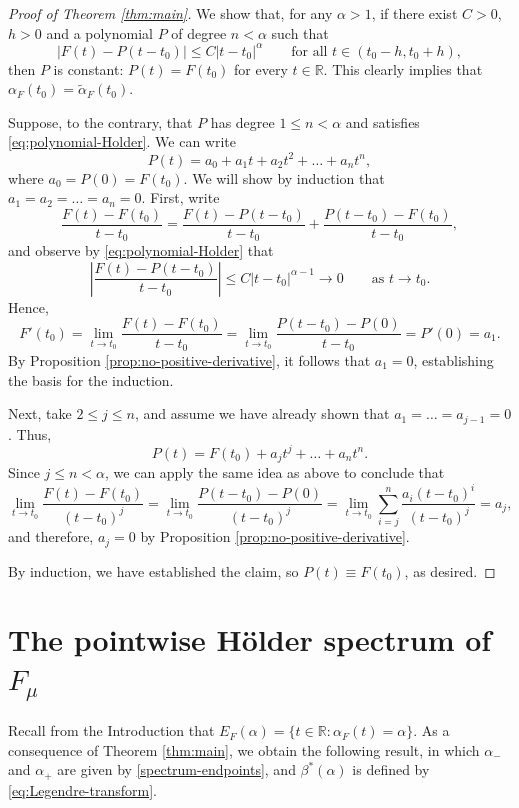\documentclass[11pt]{amsart}
\newcommand\RR{\mathbb{R}}
\newcommand{\1}{1}
\begin{document}
\begin{proof}[Proof of Theorem \ref{thm:main}]
We show that, for any $\alpha>1$, if there {exist $C>0$, $h>0$ and} a polynomial $P$ of degree $n<\alpha$ such that
\begin{equation} \label{eq:polynomial-Holder}
|F(t)-P(t-t_0)|\leq C|t-t_0|^\alpha \qquad \mbox{for all {$t\in(t_0-h,t_0+h)$}},
\end{equation}
then $P$ is constant: $P(t)=F(t_0)$ for every $t\in\RR$. This clearly implies that $\alpha_F(t_0)=\tilde{\alpha}_F(t_0)$.

Suppose, to the contrary, that $P$ has degree $1\leq n<\alpha$ and satisfies \eqref{eq:polynomial-Holder}. We can write
\[
P(t)=a_0+a_1 t+a_2 t^2+\dots +a_n t^n,
\]
where $a_0=P(0)=F(t_0)$. We will show by induction that $a_1=a_2=\dots=a_n=0$. First, write
\[
\frac{F(t)-F(t_0)}{t-t_0}=\frac{F(t)-P(t-t_0)}{t-t_0}+\frac{P(t-t_0)-F(t_0)}{t-t_0},
\]
and observe by \eqref{eq:polynomial-Holder} that
\[
\left|\frac{F(t)-P(t-t_0)}{t-t_0}\right|\leq C|t-t_0|^{\alpha-1} \to 0 \qquad \mbox{as $t\to t_0$}.
\]
Hence,
\[
F'(t_0)=\lim_{t\to t_0}\frac{F(t)-F(t_0)}{t-t_0}=\lim_{t\to t_0}\frac{P(t-t_0)-P(0)}{t-t_0}=P'(0)=a_1.
\]
By Proposition \ref{prop:no-positive-derivative}, it follows that $a_1=0$, establishing the basis for the induction.

Next, take $2\leq j\leq n$, and assume we have already shown that $a_1=\dots=a_{j-1}=0$. Thus,
\[
P(t)=F(t_0)+a_j t^j+\dots+a_n t^n.
\]
Since $j\leq n<\alpha$, we can apply the same idea as above to conclude that
\[
\lim_{t\to t_0}\frac{F(t)-F(t_0)}{(t-t_0)^j}=\lim_{t\to t_0}\frac{P(t-t_0)-P(0)}{(t-t_0)^j}=\lim_{t\to t_0}\sum_{i=j}^n \frac{a_i(t-t_0)^i}{(t-t_0)^j}=a_j,
\]
and therefore, $a_j=0$ by Proposition \ref{prop:no-positive-derivative}.

By induction, we have established the claim, so $P(t)\equiv F(t_0)$, as desired.
\end{proof}


\section{The pointwise H\"older spectrum of $F_\mu$} \label{sec:Holder-spectrum}

Recall from the Introduction that $E_F(\alpha)=\{t\in\RR:\alpha_F(t)=\alpha\}$.
As a consequence of Theorem \ref{thm:main}, we obtain the following result, in which $\alpha_-$ and $\alpha_+$ are given by \eqref{spectrum-endpoints}, and $\beta^*(\alpha)$ is defined by \eqref{eq:Legendre-transform}.
\end{document}

